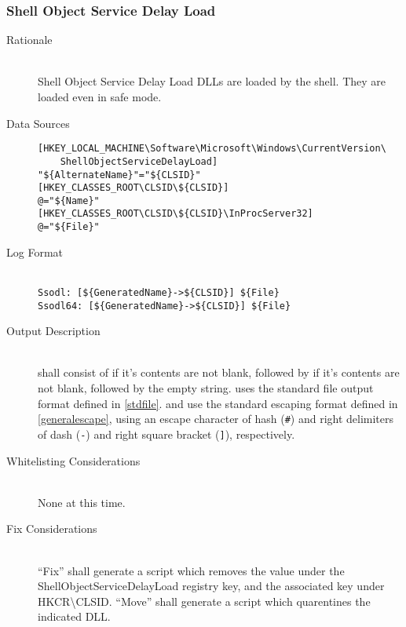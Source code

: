 \subsubsection{Shell Object Service Delay Load}
\begin{description}
\item[Rationale] \hfill \\
Shell Object Service Delay Load DLLs are loaded by the shell. They are loaded
even in safe mode.
\item[Data Sources] \hfill
\vspace{-\baselineskip}
\begin{verbatim}
[HKEY_LOCAL_MACHINE\Software\Microsoft\Windows\CurrentVersion\
    ShellObjectServiceDelayLoad]
"${AlternateName}"="${CLSID}"
[HKEY_CLASSES_ROOT\CLSID\${CLSID}]
@="${Name}"
[HKEY_CLASSES_ROOT\CLSID\${CLSID}\InProcServer32]
@="${File}"
\end{verbatim}
\item[Log Format] \hfill \\
\verb|Ssodl: [${GeneratedName}->${CLSID}] ${File}| \\
\verb|Ssodl64: [${GeneratedName}->${CLSID}] ${File}|
\item[Output Description] \hfill \\
 shall consist of  if it's
contents are not blank, followed by  if it's contents are
not blank, followed by the empty string. \var{File} uses the standard file
output format defined in \ref{stdfile}. \var{GeneratedName} and \var{CLSID} use
the standard escaping format defined in \ref{generalescape}, using an escape
character of hash (\verb|#|) and right delimiters of dash (\verb|-|) and
right square bracket (\verb|]|), respectively.
\item[Whitelisting Considerations] \hfill \\
None at this time.
\item[Fix Considerations] \hfill \\
``Fix'' shall generate a script which removes the value under the
ShellObjectServiceDelayLoad registry key, and the associated key under
HKCR\textbackslash{}CLSID.
``Move'' shall generate a script which quarentines the indicated DLL.
\end{description}

